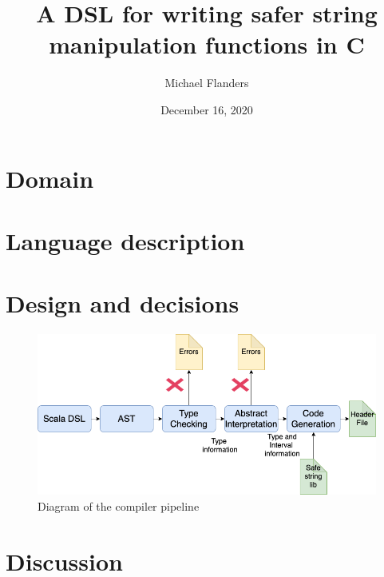 \documentclass[letterpaper]{article}
\title{A DSL for writing safer string manipulation functions in C}
\author{Michael Flanders}
\date{December 16, 2020}
\begin{document}
\maketitle


\section{Domain}


\section{Language description}


\section{Design and decisions}

\begin{figure}[h]
  \centering
  \includegraphics[width=\textwidth]{architecture.png}
  \caption{Diagram of the compiler pipeline}
  \label{fig:pipeline}
\end{figure}


\section{Discussion}

\end{document}
